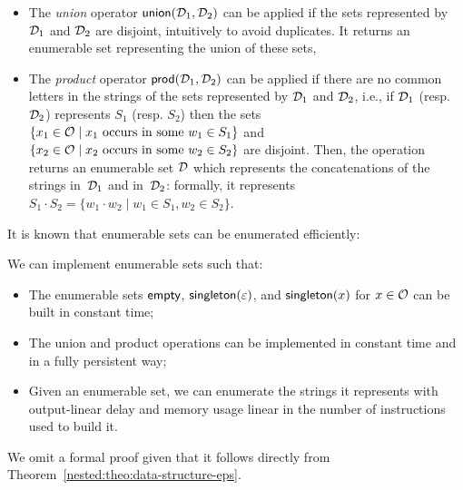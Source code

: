 \begin{itemize}
  \item The \emph{union} operator $\textsf{union}(\mathcal{D}_1, \mathcal{D}_2)$ can
    be applied if the sets represented by $\mathcal{D}_1$ and $\mathcal{D}_2$ are
    disjoint, intuitively to avoid duplicates. It returns an enumerable set representing the
    union of these sets,
    
  \item The \emph{product} operator $\textsf{prod}(\mathcal{D}_1, \mathcal{D}_2)$
    can be applied if there are no common letters in the strings of
    the sets represented by $\mathcal{D}_1$ and $\mathcal{D}_2$, i.e., if $\mathcal{D}_1$
    (resp. $\mathcal{D}_2$) represents $S_1$ (resp. $S_2$) then the sets
    $\{x_1 \in \mathcal{O} \mid x_1 \text{~occurs~in~some~} w_1 \in S_1\}$ and
    $\{x_2 \in \mathcal{O} \mid x_2 \text{~occurs~in~some~} w_2 \in S_2\}$ are
    disjoint.  Then, the operation returns an enumerable set $\mathcal{D}$
    which represents the concatenations of the strings in~$\mathcal{D}_1$ and
    in~$\mathcal{D}_2$: formally, it represents $S_1 \cdot S_2 = \{w_1 \cdot w_2 \mid
    w_1 \in S_1, w_2 \in S_2\}$.
\end{itemize}

%
%

It is known that enumerable sets can be enumerated efficiently:

\begin{theorem}
  \label{gram:thm:enum}
  We can implement enumerable sets such that:
\begin{itemize} \item The enumerable
        sets $\mathsf{empty}$, $\textsf{singleton}(\varepsilon)$, and $\textsf{singleton}(x)$ for $x \in \mathcal{O}$ can be built in
  constant time;
\item The union and product
  operations can be implemented in constant time and in a fully
  persistent way;
\item Given an enumerable set,  we can enumerate the strings
      it represents with output-linear delay and memory usage linear
  in the number of instructions used to build it.
\end{itemize}
\end{theorem}

We omit a formal proof given that it follows directly from Theorem~\ref{nested:theo:data-structure-eps}.

